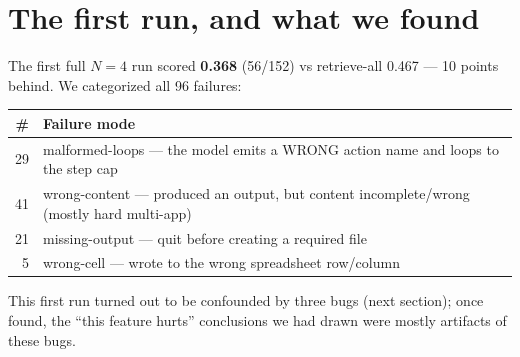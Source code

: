 \documentclass[11pt]{article}
\begin{document}
\section{The first run, and what we found}
The first full $N{=}4$ run scored \textbf{0.368} (56/152) vs retrieve-all 0.467 --- 10 points behind. We
categorized all 96 failures:
\begin{center}
\begin{tabular}{@{}rl@{}}
\toprule
\# & Failure mode \\
\midrule
29 & malformed-loops --- the model emits a WRONG action name and loops to the step cap \\
41 & wrong-content --- produced an output, but content incomplete/wrong (mostly hard multi-app) \\
21 & missing-output --- quit before creating a required file \\
5  & wrong-cell --- wrote to the wrong spreadsheet row/column \\
\bottomrule
\end{tabular}
\end{center}
This first run turned out to be confounded by three bugs (next section); once found, the ``this feature
hurts'' conclusions we had drawn were mostly artifacts of these bugs.

\end{document}
